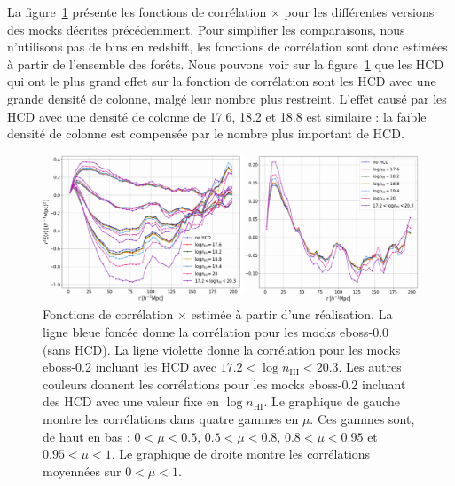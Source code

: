 La figure~\ref{fig:cf_nhi_bins} présente les fonctions de corrélation \lya{}$\times$\lya{} pour les différentes versions des mocks décrites précédemment. Pour simplifier les comparaisons, nous n'utilisons pas de bins en redshift, les fonctions de corrélation sont donc estimées à partir de l'ensemble des forêts.
Nous pouvons voir sur la figure~\ref{fig:cf_nhi_bins} que les HCD qui ont le plus grand effet sur la fonction de corrélation sont les HCD avec une grande densité de colonne, malgé leur nombre plus restreint. L'effet causé par les HCD avec une densité de colonne de \num{17.6}, \num{18.2} et \num{18.8} est similaire : la faible densité de colonne est compensée par le nombre plus important de HCD.

\begin{figure}
  \centering
  \includegraphics[scale=0.35]{cf_nhi_bins}
  \caption{Fonctions de corrélation \lya{}$\times$\lya{} estimée à partir d'une réalisation.
    La ligne bleue foncée donne la corrélation pour les mocks eboss-0.0 (sans HCD). La ligne violette donne la corrélation pour les mocks eboss-0.2 incluant les HCD avec $\num{17.2} < \log n_{\mathrm{HI}} < \num{20.3}$. Les autres couleurs donnent les corrélations pour les mocks eboss-0.2 incluant des HCD avec une valeur fixe en $\log n_{\mathrm{HI}}$.
    Le graphique de gauche montre les corrélations dans quatre gammes en $\mu$. Ces gammes sont, de haut en bas : $\num{0}<\mu<\num{0.5}$, $\num{0.5}<\mu<\num{0.8}$, $\num{0.8}<\mu<\num{0.95}$ et $\num{0.95}<\mu<\num{1}$. Le graphique de droite montre les corrélations moyennées sur $\num{0} < \mu < \num{1}$.}
  \label{fig:cf_nhi_bins}
\end{figure}

